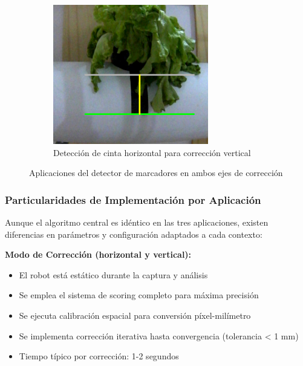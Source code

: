\begin{figure}[H]
\begin{subfigure}[b]{0.48\textwidth}
    \includegraphics[width=\textwidth]{imagenes/detector_marcadores_5_lineas_horizontales.png}
    \caption{Detección de cinta horizontal para corrección vertical}
\end{subfigure}
\caption{Aplicaciones del detector de marcadores en ambos ejes de corrección}
\label{fig:aplicaciones_marcadores}
\end{figure}

\subsubsection{Particularidades de Implementación por Aplicación}

Aunque el algoritmo central es idéntico en las tres aplicaciones, existen diferencias en parámetros y configuración adaptados a cada contexto:

\textbf{Modo de Corrección (horizontal y vertical):}
\begin{itemize}
\item El robot está estático durante la captura y análisis
\item Se emplea el sistema de scoring completo para máxima precisión
\item Se ejecuta calibración espacial para conversión píxel-milímetro
\item Se implementa corrección iterativa hasta convergencia (tolerancia < 1 mm)
\item Tiempo típico por corrección: 1-2 segundos
\end{itemize}

